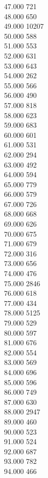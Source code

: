 { 47.000	721 \\
 48.000	650 \\
 49.000	10207 \\
 50.000	588 \\
 51.000	553 \\
 52.000	631 \\
 53.000	643 \\
 54.000	262 \\
 55.000	566 \\
 56.000	490 \\
 57.000	818 \\
 58.000	623 \\
 59.000	683 \\
 60.000	601 \\
 61.000	531 \\
 62.000	294 \\
 63.000	492 \\
 64.000	594 \\
 65.000	779 \\
 66.000	579 \\
 67.000	726 \\
 68.000	668 \\
 69.000	626 \\
 70.000	675 \\
 71.000	679 \\
 72.000	316 \\
 73.000	656 \\
 74.000	476 \\
 75.000	2846 \\
 76.000	618 \\
 77.000	434 \\
 78.000	5125 \\
 79.000	529 \\
 80.000	597 \\
 81.000	676 \\
 82.000	554 \\
 83.000	569 \\
 84.000	696 \\
 85.000	596 \\
 86.000	749 \\
 87.000	630 \\
 88.000	2947 \\
 89.000	460 \\
 90.000	523 \\
 91.000	524 \\
 92.000	687 \\
 93.000	782 \\
 94.000	466 \\
}
